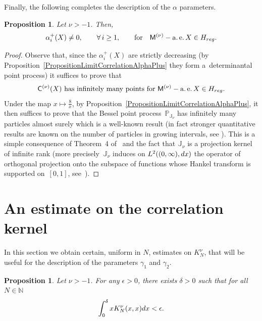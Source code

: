\documentclass[11pt]{article}
\numberwithin{equation}{section}
\newtheorem{Proposition}[Theorem]{Proposition}
{ \theoremstyle{definition}
\newtheorem{Definition}[Theorem]{Definition}
\newtheorem{Remark}[Theorem]{Remark} }
\begin{document}
Finally, the following completes the description of the $\alpha$ parameters.

\begin{Proposition}\label{PropositionAlphaPlus} Let $\nu>-1$. Then,
\begin{gather*}
\alpha_i^+(X)\neq 0, \qquad \forall\, i\ge 1, \qquad \text{for}\quad \mathsf{M}^{(\nu)}-\operatorname{a.e.} X \in H_{{\rm reg}}.
\end{gather*}
\end{Proposition}

\begin{proof}Observe that, since the $\alpha_i^+(X)$ are strictly decreasing (by Proposition~\ref{PropositionLimitCorrelationAlphaPlus} they form a~determinantal point process) it suffices to prove that
\begin{gather*}
\mathsf{C}^{(\nu)}(X)\  \text{has infinitely many points for} \ \mathsf{M}^{(\nu)}-\operatorname{a.e.} X \in H_{{\rm reg}}.
\end{gather*}
Under the map $x \mapsto \frac{8}{x}$, by Proposition~\ref{PropositionLimitCorrelationAlphaPlus}, it then suffices to prove that the Bessel point process~$\mathbb{P}_{\mathbb{J}_{\nu}}$ has infinitely many particles almost surely which is a well-known result (in fact stronger quantitative results are known on the number of particles in growing intervals, see \cite[Theorem~2]{SoshnikovGaussianFluctuations}). This is a simple consequence of Theorem~4 of~\cite{Soshnikov} and the fact that $\mathbb{J}_{\nu}$ is a projection kernel of infinite rank (more precisely~$\mathbb{J}_{\nu}$ induces on $L^2 ((0,\infty),{\rm d}x )$ the operator of orthogonal projection onto the subspace of functions whose Hankel transform is supported on~$[0,1]$, see~\cite{TracyWidom}).
\end{proof}

\section{An estimate on the correlation kernel}\label{section5}
In this section we obtain certain, uniform in $N$, estimates on $K_N^{\nu}$, that will be useful for the description of the parameters $\gamma_1$ and $\gamma_2$.

\begin{Proposition}\label{EstimateGamma1}
Let $\nu>-1$. For any $\epsilon>0$, there exists $\delta>0$ such that for all $N \in \mathbb{N}$
\begin{gather*}
\int_{0}^{\delta}xK^{\nu}_N(x,x){\rm d}x<\epsilon.
\end{gather*}
\end{Proposition}
\end{document}

